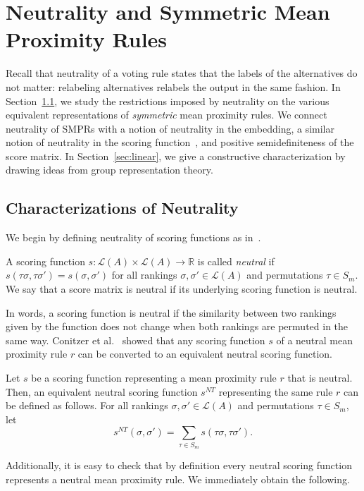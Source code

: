 \documentclass[prodmode,acmec]{ec-acmsmall}
\newcommand{\calL}{{\mathcal{L}}}
\newcommand{\rank}{{\calL(A)}}
\newcommand{\nt}{NT}
\begin{document}

\section{Neutrality and Symmetric Mean Proximity Rules}
\label{sec:neutrality}
Recall that neutrality of a voting rule states that the labels of the alternatives do not matter: relabeling alternatives relabels the output in the same fashion. In Section~\ref{sec:charact}, we study the restrictions imposed by neutrality on the various equivalent representations of \emph{symmetric} mean proximity rules. We connect neutrality of SMPRs with a notion of neutrality in the embedding, a similar notion of neutrality in the scoring function~\cite{CRX09}, and positive semidefiniteness of the score matrix. In Section~\ref{sec:linear}, we give a constructive characterization by drawing ideas from group representation theory. 

\subsection{Characterizations of Neutrality}
\label{sec:charact}

We begin by defining neutrality of scoring functions as in~\cite{CRX09}. 

\begin{definition}
A scoring function $s: \rank \times \rank \rightarrow \mathbb{R}$ is called \emph{neutral} if $s(\tau \sigma, \tau \sigma') = s(\sigma,\sigma')$ for all rankings $\sigma,\sigma' \in \rank$ and permutations $\tau \in S_m$. We say that a score matrix is neutral if its underlying scoring function is neutral. 
\end{definition}
In words, a scoring function is neutral if the similarity between two rankings given by the function does not change when both rankings are permuted in the same way. Conitzer et al.~ showed that any scoring function $s$ of a neutral mean proximity rule $r$ can be converted to an equivalent neutral scoring function.

\begin{proposition} Let $s$ be a scoring function representing a mean proximity rule $r$ that is neutral. Then, an equivalent neutral scoring function $s^{\nt}$ representing the same rule $r$ can be defined as follows. For all rankings $\sigma,\sigma' \in \rank$ and permutations $\tau \in S_m$, let
\begin{equation}
s^{\nt}(\sigma,\sigma') = \sum_{\tau \in S_m} s(\tau \sigma, \tau \sigma').
\label{eqn:s-nt}
\end{equation}
\label{prop:neutral-scoring}
\end{proposition}
%
Additionally, it is easy to check that by definition every neutral scoring function represents a neutral mean proximity rule. We immediately obtain the following.
 
\end{document}

